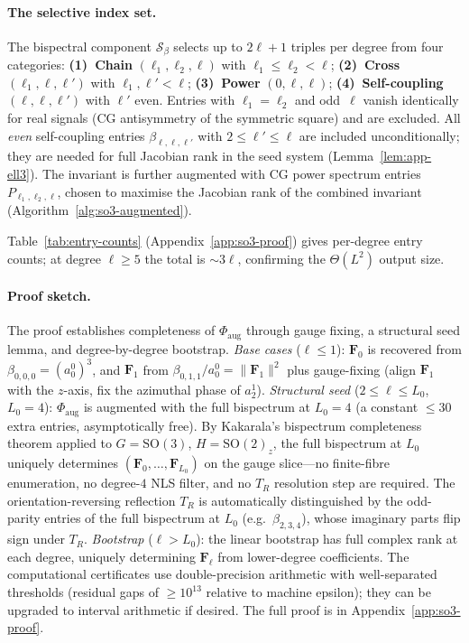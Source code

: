 \documentclass{article}
\theoremstyle{definition}
\theoremstyle{remark}
\newcommand{\SO}{\mathrm{SO}}
\newcommand{\norm}[1]{\lVert #1 \rVert}
\theoremstyle{definition}
\begin{document}
\paragraph{The selective index set.}
The bispectral component $\mathcal{S}_\beta$ selects up to
$2\ell{+}1$ triples per degree from four categories:
\textbf{(1)~Chain} $(\ell_1, \ell_2, \ell)$ with
$\ell_1 \leq \ell_2 < \ell$;
\textbf{(2)~Cross} $(\ell_1, \ell, \ell')$ with
$\ell_1, \ell' < \ell$;
\textbf{(3)~Power} $(0, \ell, \ell)$;
\textbf{(4)~Self-coupling} $(\ell, \ell, \ell')$ with $\ell'$ even.
Entries with $\ell_1 = \ell_2$ and odd~$\ell$ vanish identically
for real signals (CG antisymmetry of the symmetric square) and
are excluded.  All \emph{even} self-coupling entries
$\beta_{\ell,\ell,\ell'}$ with $2 \le \ell' \le \ell$ are
included unconditionally; they are needed for full Jacobian rank
in the seed system (Lemma~\ref{lem:app-ell3}).
The invariant is further augmented with
CG power spectrum entries $P_{\ell_1,\ell_2,\ell}$, chosen
to maximise the Jacobian rank of the combined invariant
(Algorithm~\ref{alg:so3-augmented}).

Table~\ref{tab:entry-counts} (Appendix~\ref{app:so3-proof}) gives
per-degree entry counts; at degree $\ell \ge 5$ the total is
${\sim}3\ell$, confirming the $\Theta(L^2)$ output size.

\paragraph{Proof sketch.}
The proof establishes completeness of $\Phi_{\mathrm{aug}}$ through
gauge fixing, a structural seed lemma, and degree-by-degree bootstrap.
\emph{Base cases} ($\ell \le 1$): $\mathbf{F}_0$ is recovered from
$\beta_{0,0,0} = (a_0^0)^3$, and $\mathbf{F}_1$ from
$\beta_{0,1,1}/a_0^0 = \norm{\mathbf{F}_1}^2$ plus gauge-fixing
(align $\mathbf{F}_1$ with the $z$-axis, fix the azimuthal phase
of $a_2^1$).
\emph{Structural seed} ($2 \le \ell \le L_0$, $L_0 = 4$):
$\Phi_{\mathrm{aug}}$ is augmented with the full bispectrum at
$L_0 = 4$ (a constant ${\le}30$ extra entries, asymptotically free).
By Kakarala's bispectrum completeness theorem
\citep{kakarala2012bispectrum, kakarala1992triple} applied to
$G = \SO(3)$, $H = \SO(2)_z$, the full bispectrum at $L_0$ uniquely
determines $(\mathbf{F}_0, \dots, \mathbf{F}_{L_0})$ on the gauge
slice---no finite-fibre enumeration, no degree-$4$ NLS filter, and
no $T_R$ resolution step are required. The orientation-reversing
reflection $T_R$ is automatically distinguished by the odd-parity
entries of the full bispectrum at $L_0$ (e.g.\ $\beta_{2,3,4}$),
whose imaginary parts flip sign under $T_R$.
\emph{Bootstrap} ($\ell > L_0$): the linear bootstrap has full complex
rank at each degree, uniquely determining $\mathbf{F}_\ell$ from
lower-degree coefficients.
The computational certificates use double-precision arithmetic with
well-separated thresholds (residual gaps of $\ge 10^{13}$ relative to
machine epsilon); they can be upgraded to interval arithmetic if desired.
The full proof is in Appendix~\ref{app:so3-proof}.
\end{document}
